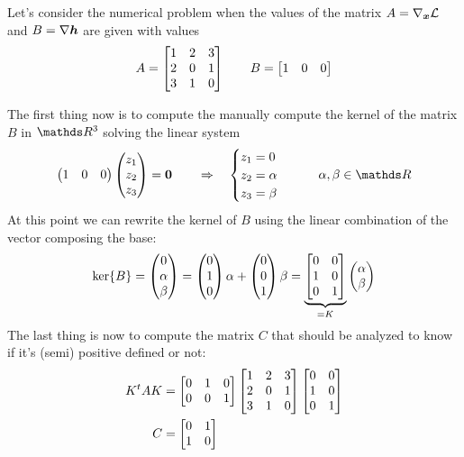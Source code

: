 		\begin{example}{}
			Let's consider the numerical problem when the values of the matrix $A = \nabla_{\boldsymbol{x}} \mathcal L$ and $B=\nabla \boldsymbol{h}$ are given with values
			\[ A = \begin{bmatrix} 1 & 2 & 3 \\ 2 & 0 & 1 \\ 3 & 1 & 0 \end{bmatrix} \qquad B = \begin{bmatrix} 1&0&0 \end{bmatrix} \]
			
			The first thing now is to compute the manually compute the kernel of the matrix $B$ in $\R^3$ solving the linear system
			\[ \vector{1 &0 &0} \vector{z_1 \\ z_2 \\ z_3} = \vett 0 \qquad \Rightarrow \quad \begin{cases}
				z_1 = 0 \\ z_2 = \alpha \\ z_3 = \beta
			\end{cases} \qquad \alpha,\beta\in\R \]
			At this point we can rewrite the kernel of $B$ using the linear combination of the vector composing the base:
			\[ \ker\{B\} = \begin{pmatrix} 0 \\ \alpha \\ \beta \end{pmatrix} = \begin{pmatrix} 0 \\ 1 \\ 0 \end{pmatrix} \alpha + \begin{pmatrix} 0 \\ 0 \\ 1 \end{pmatrix} \beta = \underbrace{\begin{bmatrix} 0 & 0 \\ 1 & 0 \\ 0 & 1 \end{bmatrix}}_{=K} \begin{pmatrix} \alpha \\ \beta \end{pmatrix} \]
			The last thing is now to compute the matrix $C$ that should be analyzed to know if it's (semi) positive defined or not:
			\begin{align*}
				K^t AK& = \begin{bmatrix} 0 & 1 & 0 \\ 0 & 0 & 1 \end{bmatrix} \begin{bmatrix} 1 & 2 & 3 \\ 2 & 0 & 1 \\ 3 & 1 & 0 \end{bmatrix} \begin{bmatrix} 0 & 0 \\ 1 & 0 \\ 0 & 1 \end{bmatrix} \\
				C & = \begin{bmatrix} 0&1\\1&0 \end{bmatrix}
			\end{align*}
			
		\end{example}
	
